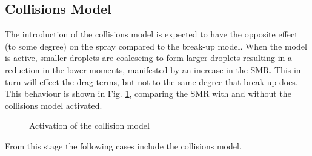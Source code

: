 \documentclass[a4paper,10pt]{article}
\begin{document}
\subsection{Collisions Model} %
The introduction of the collisions model is expected to have the opposite effect (to some degree) on the spray compared to the break-up model. When the model is active, smaller droplets are coalescing to form larger droplets resulting in a reduction in the lower moments, manifested by an increase in the SMR. This in turn will effect the drag terms, but not to the same degree that break-up does. This behaviour is shown in Fig. \ref{fig:coll_mod}, comparing the SMR with and without the collisions model activated.
\begin{figure}[H]
\centering
{}
\caption{Activation of the collision model}
\label{fig:coll_mod}
\end{figure}
From this stage the following cases include the collisions model.
\end{document}
